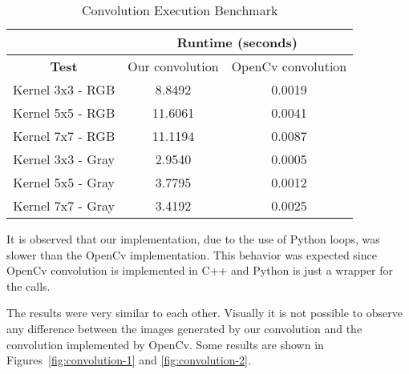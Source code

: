 \documentclass[]{IEEEtran}
\begin{document}
\begin{table}[h!]
\begin{tabular}{|c|c|c|}
\hline
\textbf{}         & \multicolumn{2}{c|}{\textbf{Runtime (seconds)}}                                \\ \hline
\textbf{Test}     & \multicolumn{1}{l|}{Our convolution} & \multicolumn{1}{l|}{OpenCv convolution} \\ \hline
Kernel 3x3 - RGB  & 8.8492                               & 0.0019                                  \\ \hline
Kernel 5x5 - RGB  & 11.6061                              & 0.0041                                  \\ \hline
Kernel 7x7 - RGB  & 11.1194                              & 0.0087                                  \\ \hline
Kernel 3x3 - Gray & 2.9540                               & 0.0005                                  \\ \hline
Kernel 5x5 - Gray & 3.7795                               & 0.0012                                  \\ \hline
Kernel 7x7 - Gray & 3.4192                               & 0.0025                                  \\ \hline
\end{tabular}
\caption{Convolution Execution Benchmark}
\label{table-convolution}
\end{table}

It is observed that our implementation, due to the use of Python loops, was slower than the OpenCv implementation. This behavior was expected since OpenCv convolution is implemented in C++ and Python is just a wrapper for the calls.

The results were very similar to each other. Visually it is not possible to observe any difference between the images generated by our convolution and the convolution implemented by OpenCv. Some results are shown in Figures~\ref{fig:convolution-1} and \ref{fig:convolution-2}.

\end{document}
